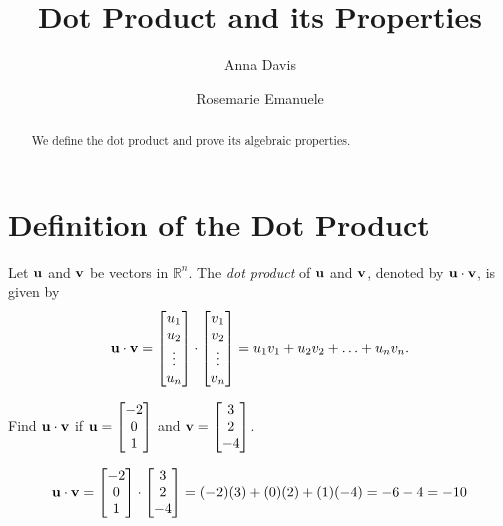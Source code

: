 \documentclass{ximera}
\author{Anna Davis \and Rosemarie Emanuele} \title{Dot Product and its Properties} \license{CC-BY 4.0}
\renewcommand{\vec}[1]{{\bf #1}}
\newcommand{\RR}{\mathbb{R}}
\newcommand{\dfn}{\textit}
\newcommand{\dotp}{\cdot}
\begin{document}
\begin{abstract}
  We define the dot product and prove its algebraic properties.
\end{abstract}
\maketitle

\section*{Definition of the Dot Product}

\begin{definition}
  Let $\vec{u}$ and $\vec{v}$ be vectors in $\RR^n$.  The \dfn{dot
    product} of $\vec{u}$ and $\vec{v}$, denoted by
  $\vec{u}\dotp \vec{v}$, is given by
  \begin{align*}
    \vec{u}\dotp\vec{v}=\begin{bmatrix}u_1\\u_2\\\vdots\\u_n\end{bmatrix}\dotp\begin{bmatrix}v_1\\v_2\\\vdots\\v_n\end{bmatrix}=u_1v_1+u_2v_2+\ldots+u_nv_n.
  \end{align*}
\end{definition}

\begin{example}\label{dotex}
  Find $\vec{u}\dotp \vec{v}$ if
  $\vec{u}=\begin{bmatrix}-2\\0\\1\end{bmatrix}$ and
  $\vec{v}=\begin{bmatrix}3\\2\\-4\end{bmatrix}$.

  \begin{explanation}
    $$\vec{u}\dotp\vec{v}=\begin{bmatrix}-2\\0\\1\end{bmatrix}\dotp\begin{bmatrix}3\\2\\-4\end{bmatrix}=(-2)(3)+(0)(2)+(1)(-4)=-6-4=-10$$
  \end{explanation}
\end{example}
\end{document}
